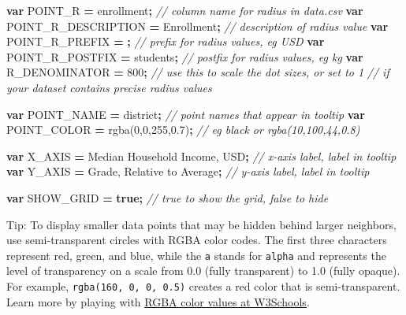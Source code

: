 \documentclass[
  english,
]{book}
\newenvironment{Shaded}{\begin{snugshade}}{\end{snugshade}}
\newcommand{\CommentTok}[1]{\textcolor[rgb]{0.56,0.35,0.01}{\textit{#1}}}
\newcommand{\DecValTok}[1]{\textcolor[rgb]{0.00,0.00,0.81}{#1}}
\newcommand{\KeywordTok}[1]{\textcolor[rgb]{0.13,0.29,0.53}{\textbf{#1}}}
\newcommand{\NormalTok}[1]{#1}
\newcommand{\OperatorTok}[1]{\textcolor[rgb]{0.81,0.36,0.00}{\textbf{#1}}}
\newcommand{\StringTok}[1]{\textcolor[rgb]{0.31,0.60,0.02}{#1}}
\begin{document}
\begin{Shaded}
\begin{Highlighting}[]
\KeywordTok{var}\NormalTok{ POINT\_R }\OperatorTok{=} \StringTok{\textquotesingle{}enrollment\textquotesingle{}}\OperatorTok{;} \CommentTok{// column name for radius in data.csv}
\KeywordTok{var}\NormalTok{ POINT\_R\_DESCRIPTION }\OperatorTok{=} \StringTok{\textquotesingle{}Enrollment\textquotesingle{}}\OperatorTok{;} \CommentTok{// description of radius value}
\KeywordTok{var}\NormalTok{ POINT\_R\_PREFIX }\OperatorTok{=} \StringTok{\textquotesingle{}\textquotesingle{}}\OperatorTok{;} \CommentTok{// prefix for radius values, eg \textquotesingle{}USD \textquotesingle{}}
\KeywordTok{var}\NormalTok{ POINT\_R\_POSTFIX }\OperatorTok{=} \StringTok{\textquotesingle{} students\textquotesingle{}}\OperatorTok{;} \CommentTok{// postfix for radius values, eg \textquotesingle{} kg\textquotesingle{}}
\KeywordTok{var}\NormalTok{ R\_DENOMINATOR }\OperatorTok{=} \DecValTok{800}\OperatorTok{;}  \CommentTok{// use this to scale the dot sizes, or set to 1}
                          \CommentTok{// if your dataset contains precise radius values}

\KeywordTok{var}\NormalTok{ POINT\_NAME }\OperatorTok{=} \StringTok{\textquotesingle{}district\textquotesingle{}}\OperatorTok{;} \CommentTok{// point names that appear in tooltip}
\KeywordTok{var}\NormalTok{ POINT\_COLOR }\OperatorTok{=} \StringTok{\textquotesingle{}rgba(0,0,255,0.7)\textquotesingle{}}\OperatorTok{;} \CommentTok{// eg \textasciigrave{}black\textasciigrave{} or \textasciigrave{}rgba(10,100,44,0.8)\textasciigrave{}}

\KeywordTok{var}\NormalTok{ X\_AXIS }\OperatorTok{=} \StringTok{\textquotesingle{}Median Household Income, USD\textquotesingle{}}\OperatorTok{;} \CommentTok{// x{-}axis label, label in tooltip}
\KeywordTok{var}\NormalTok{ Y\_AXIS }\OperatorTok{=} \StringTok{\textquotesingle{}Grade, Relative to Average\textquotesingle{}}\OperatorTok{;} \CommentTok{// y{-}axis label, label in tooltip}

\KeywordTok{var}\NormalTok{ SHOW\_GRID }\OperatorTok{=} \KeywordTok{true}\OperatorTok{;} \CommentTok{// \textasciigrave{}true\textasciigrave{} to show the grid, \textasciigrave{}false\textasciigrave{} to hide}
\end{Highlighting}
\end{Shaded}

Tip: To display smaller data points that may be hidden behind larger neighbors, use semi-transparent circles with RGBA color codes. The first three characters represent red, green, and blue, while the \texttt{a} stands for \texttt{alpha} and represents the level of transparency on a scale from 0.0 (fully transparent) to 1.0 (fully opaque). For example, \texttt{rgba(160,\ 0,\ 0,\ 0.5)} creates a red color that is semi-transparent. Learn more by playing with \href{https://www.w3schools.com/css/css_colors_rgb.asp}{RGBA color values at W3Schools}.
\end{document}
